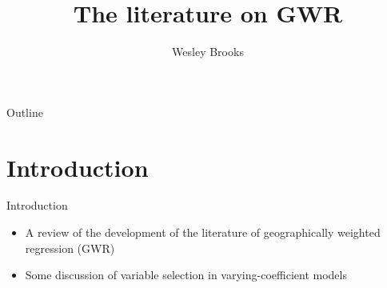 \documentclass{beamer}
\author{Wesley Brooks}
\title[Lit review]{The literature on GWR}
\institute{UW-Madison}
\begin{document}
    \begin{frame}
        \titlepage
    \end{frame}


    \begin{frame}{Outline}
        \tableofcontents
    \end{frame}

    
    \section{Introduction}
    \begin{frame}{Introduction}
        \begin{itemize}
            \item A review of the development of the literature of geographically weighted regression (GWR)
            \item Some discussion of variable selection in varying-coefficient models
        \end{itemize}
    \end{frame}
\end{document}
